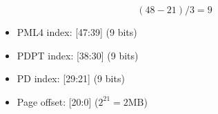 \begin{parts}
    \begin{equation*}
        (48 - 21) / 3 = 9
    \end{equation*}

    \begin{itemize}
        \item PML4 index: [47:39] (9 bits)
        \item PDPT index: [38:30] (9 bits)
        \item PD index: [29:21] (9 bits)
        \item Page offset: [20:0] ($2^{21} = 2\text{MB}$)
    \end{itemize}

\end{parts}
